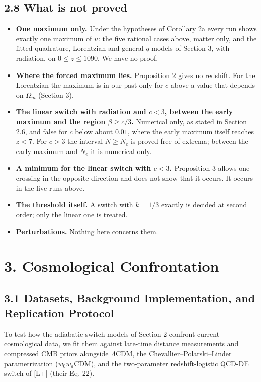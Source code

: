 \documentclass[11pt,a4paper]{article}
\begin{document}
\subsection*{2.8 What is not proved}
\begin{itemize}
\item{} {\bfseries\boldmath One maximum only.} Under the hypotheses of Corollary 2a every run shows exactly one maximum of $u$: the five
rational cases above, matter only, and the fitted quadrature, Lorentzian and general-$q$ models of Section 3,
with radiation, on $0 \le z \le 1090$. We have no proof.
\item{} {\bfseries\boldmath Where the forced maximum lies.} Proposition 2 gives no redshift. For the Lorentzian the maximum is in our past
only for $c$ above a value that depends on $\Omega_m$ (Section 3).
\item{} {\bfseries\boldmath The linear switch with radiation and $c < 3$, between the early maximum and the region $\beta \ge c/3$.}
Numerical only, as stated in Section 2.6, and false for $c$ below about $0.01$, where the early maximum itself
reaches $z < 7$. For $c > 3$ the interval $N \ge N_e$ is proved free of extrema; between the early maximum and
$N_e$ it is numerical only.
\item{} {\bfseries\boldmath A minimum for the linear switch with $c < 3$.} Proposition 3 allows one crossing in the opposite direction and
does not show that it occurs. It occurs in the five runs above.
\item{} {\bfseries\boldmath The threshold itself.} A switch with $k = 1/3$ exactly is decided at second order; only the linear one is
treated.
\item{} {\bfseries\boldmath Perturbations.} Nothing here concerns them.
\end{itemize}


\section*{3. Cosmological Confrontation}

\subsection*{3.1 Datasets, Background Implementation, and Replication Protocol}
To test how the adiabatic-switch models of Section 2 confront current cosmological data, we fit them against late-time distance measurements and compressed CMB priors alongside $\Lambda$CDM, the Chevallier--Polarski--Linder parametrization ($w_0 w_a$CDM), and the two-parameter redshift-logistic QCD-DE switch of [L+] (their Eq. 22).
\end{document}
